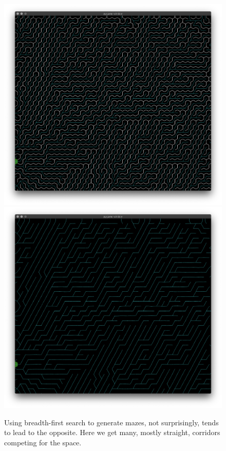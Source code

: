 \documentclass[a4paper,12pt]{article}
\begin{document}
\begin{figure}[ht]
  \centering
  \includegraphics[width=0.7\linewidth]{images/maze-bfs.png}
  \includegraphics[width=0.7\linewidth]{images/maze-bfs-connections.png}
  \caption{Using breadth-first search to generate mazes, not surprisingly, tends to
    lead to the opposite. Here we get many, mostly straight, corridors competing
    for the space.
  \label{fig:maze-bfs}}
\end{figure}
\end{document}
